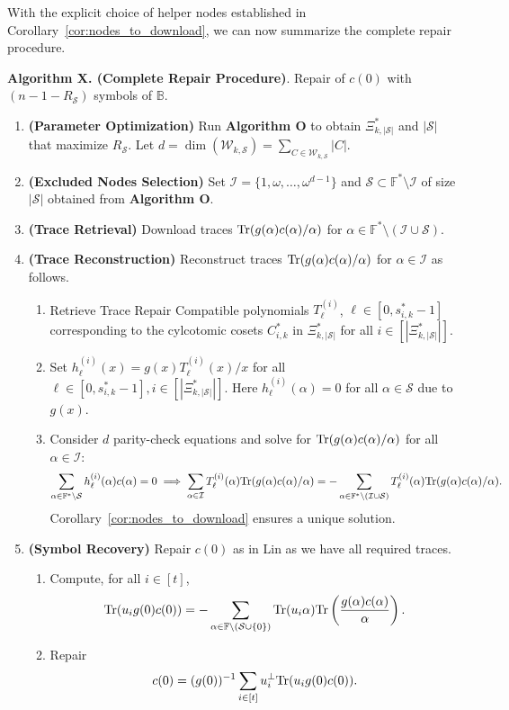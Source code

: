 \documentclass[onecolumn]{IEEEtran}
\theoremstyle{plain}
\theoremstyle{definition}
\newcommand{\FF}{\mathbb{F}}
\newcommand{\BB}{\mathbb{B}}
\newcommand{\cS}{\mathcal{S}}
\newcommand{\cW}{\mathcal{W}}
\newcommand{\cI}{\mathcal{I}}
\newcommand{\tr}{{\rm Tr}}
\begin{document}
With the explicit choice of helper nodes established in Corollary~\ref{cor:nodes_to_download}, we can now summarize the complete repair procedure.

\noindent \textbf{Algorithm X. (Complete Repair Procedure)}. Repair of $c(0)$ with $(n-1-R_\cS)$ symbols of $\BB$.
\begin{enumerate}[label = \textbf{X\arabic*.}, leftmargin=*, labelsep = 0.5em]
    \item \textbf{(Parameter Optimization)} Run \textbf{Algorithm O} to obtain $\Xi_{k,|\cS|}^*$ and $|\cS|$ that maximize $R_\cS$. Let $d = \dim(\cW_{k,\cS}) = \sum_{C\in \cW_{k,\cS}} |C|$.
    \item \textbf{(Excluded Nodes Selection)} Set $\cI = \{1,\omega,\ldots, \omega^{d-1}\}$ and $\cS\subset \FF^*\setminus\cI$ of size $|\cS|$ obtained from \textbf{Algorithm O}.
    \item \textbf{(Trace Retrieval)} Download traces $\tr(g(\alpha)c(\alpha)/\alpha)$ for $\alpha\in\FF^*\setminus(\cI\cup\cS)$.
    \item \textbf{(Trace Reconstruction)} Reconstruct traces $\tr(g(\alpha)c(\alpha)/\alpha)$ for $\alpha\in\cI$ as follows.
    \begin{enumerate}[label = \arabic*.]
        \item Retrieve Trace Repair Compatible polynomials $T_{\ell}^{(i)}$, $\ell\in [0,s_{i,k}^*-1]$ corresponding to the cylcotomic cosets $C_{i,k}^*$ in $\Xi_{k,|\cS|}^*$ for all $i\in[|\Xi_{k,|\cS|}^*|]$.
        \item Set $h_{\ell}^{(i)}(x) = g(x)T_\ell^{(i)}(x)/x$ for all $\ell\in[0,s_{i,k}^*-1],i\in[|\Xi_{k,|\cS|}^*|]$. Here $h_{\ell}^{(i)}(\alpha) = 0$ for all $\alpha\in\cS$ due to $g(x)$.
        \item Consider $d$ parity-check equations and solve for $\tr(g(\alpha)c(\alpha)/\alpha)$ for all $\alpha\in\cI$:
        $$
        \sum_{\alpha \in \FF^*\setminus\cS} h_\ell^{(i)}(\alpha)c(\alpha) = 0 \implies \sum_{\alpha \in \cI} T_\ell^{(i)}(\alpha)\tr(g(\alpha)c(\alpha)/\alpha) = - \sum_{\alpha \in \FF^*\setminus(\cI\cup\cS)} T_\ell^{(i)}(\alpha)\tr(g(\alpha)c(\alpha)/\alpha).
        $$
        Corollary~\ref{cor:nodes_to_download} ensures a unique solution. 
    \end{enumerate}
    \item \textbf{(Symbol Recovery)} Repair $c(0)$ as in Lin \cite{Lin2023} as we have all required traces.
    \begin{enumerate}[label = \arabic*.]
        \item Compute, for all $i\in[t]$,
        $$\tr(u_i g(0) c(0)) = -\sum_{\alpha\in\FF\setminus(\cS\cup\{0\})} \tr(u_i\alpha)\tr\left(\frac{g(\alpha) c(\alpha)}{\alpha}\right).$$
        \item Repair
        $$
        c(0) = (g(0))^{-1}\sum_{i\in[t]}u_i^\perp \tr(u_i g(0) c(0)).
        $$
    \end{enumerate}
\end{enumerate}
\end{document}
